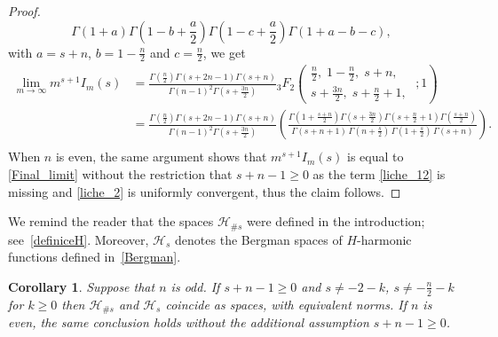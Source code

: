 \documentclass{article}
\theoremstyle{boldremark}
\newtheorem{corollary}[theorem]{Corollary}
\renewcommand\[{\begin{equation}}
\renewcommand\]{\end{equation}}
\theoremstyle{definition}
\numberwithin{equation}{section}
\begin{document}
\begin{proof}
\begin{equation*}
{}{
\Gamma(1+a)
\Gamma\!\left(1-b+\frac{a}{2}\right)
\Gamma\!\left(1-c+\frac{a}{2}\right)
\Gamma(1+a-b-c)
},
\end{equation*}
with $a = s + n$, $b = 1 - \frac n2$ and $c = \frac n2$, we get
\begin{align}\nonumber
    \lim_{m \rightarrow \infty} m^{s+1}I_m(s) &= \frac{\Gamma\!\left(\frac{n}{2}\right)\Gamma(s+2n-1)\Gamma(s+n)}
{\Gamma(n-1)^2\Gamma\!\left(s+\frac{3n}{2}\right)} {}_3F_2\!\left(
\begin{matrix}
\frac n2,\; 1-\frac n2,\; s+n, \\[4pt]
s+\frac{3n}{2},\; s+\frac n2+1,\;
\end{matrix};1
\right) \\\nonumber
&= \frac{\Gamma\!\left(\frac{n}{2}\right)\Gamma(s+2n-1)\Gamma(s+n)}
{\Gamma(n-1)^2\Gamma\!\left(s+\frac{3n}{2}\right)} \left(\frac{
\Gamma\!\left(1+\frac{s+n}{2}\right)
\Gamma\!\left(s+\frac{3n}{2}\right)
\Gamma\!\left(s+\frac n2+1\right)
\Gamma\!\left(\frac{s+n}{2}\right)
}{
\Gamma(s+n+1)\,
\Gamma\!\left(n+\frac s2\right)\,
\Gamma\!\left(1+\frac s2\right)\,
\Gamma(s+n)
}\right). \\\label{Final_limit}
\end{align}
When $n$ is even, the same argument shows that $m^{s+1}I_m(s)$ is equal to \eqref{Final_limit} without the restriction that $s +n-1\geq0$ as the term \eqref{liche_12} is missing and \eqref{liche_2} is uniformly convergent, thus the claim follows.
\end{proof}
We remind the reader that the spaces \(\mathcal{H}_{\#s}\) were defined in the introduction; see~\eqref{definiceH}. Moreover, \(\mathcal{H}_s\) denotes the Bergman spaces of \(H\)-harmonic functions defined in~\eqref{Bergman}.
\begin{corollary}\label{final_vysledek}
Suppose that \(n\) is odd. If \(s+n-1\geq0\) and \(s\neq -2-k\), $s\neq -\frac n2-k$ for $k \geq 0$ then
\(\mathcal{H}_{\#s}\) and \(\mathcal{H}_s\) coincide as spaces, with equivalent norms.
If \(n\) is even, the same conclusion holds without the additional assumption
$s +n-1\geq0$.
\end{corollary}
\end{document}
